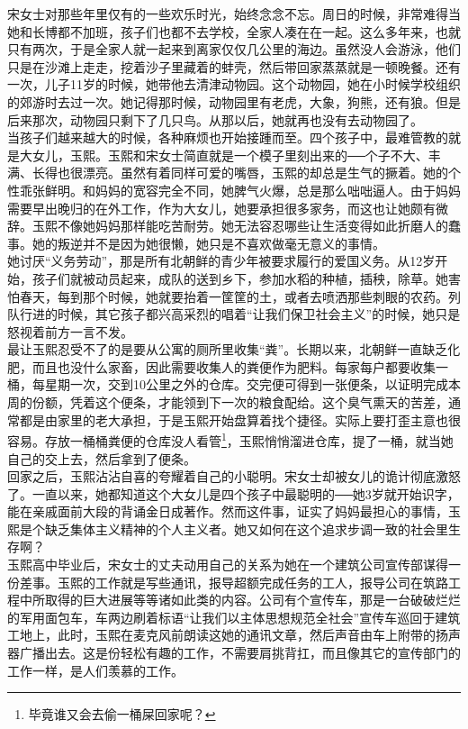 宋女士对那些年里仅有的一些欢乐时光，始终念念不忘。周日的时候，非常难得当她和长博都不加班，孩子们也都不去学校，全家人凑在在一起。这么多年来，也就只有两次，于是全家人就一起来到离家仅仅几公里的海边。虽然没人会游泳，他们只是在沙滩上走走，挖着沙子里藏着的蚌壳，然后带回家蒸蒸就是一顿晚餐。还有一次，儿子11岁的时候，她带他去清津动物园。这个动物园，她在小时候学校组织的郊游时去过一次。她记得那时候，动物园里有老虎，大象，狗熊，还有狼。但是后来那次，动物园只剩下了几只鸟。从那以后，她就再也没有去动物园了。\\

当孩子们越来越大的时候，各种麻烦也开始接踵而至。四个孩子中，最难管教的就是大女儿，玉熙。玉熙和宋女士简直就是一个模子里刻出来的──个子不大、丰满、长得也很漂亮。虽然有着同样可爱的嘴唇，玉熙的却总是生气的撅着。她的个性乖张鲜明。和妈妈的宽容完全不同，她脾气火爆，总是那么咄咄逼人。由于妈妈需要早出晚归的在外工作，作为大女儿，她要承担很多家务，而这也让她颇有微辞。玉熙不像她妈妈那样能吃苦耐劳。她无法容忍哪些让生活变得如此折磨人的蠢事。她的叛逆并不是因为她很懒，她只是不喜欢做毫无意义的事情。\\

她讨厌“义务劳动”，那是所有北朝鲜的青少年被要求履行的爱国义务。从12岁开始，孩子们就被动员起来，成队的送到乡下，参加水稻的种植，插秧，除草。她害怕春天，每到那个时候，她就要抬着一筐筐的土，或者去喷洒那些刺眼的农药。列队行进的时候，其它孩子都兴高采烈的唱着“让我们保卫社会主义”的时候，她只是怒视着前方一言不发。\\

最让玉熙忍受不了的是要从公寓的厕所里收集“粪”。长期以来，北朝鲜一直缺乏化肥，而且也没什么家畜，因此需要收集人的粪便作为肥料。每家每户都要收集一桶，每星期一次，交到10公里之外的仓库。交完便可得到一张便条，以证明完成本周的份额，凭着这个便条，才能领到下一次的粮食配给。这个臭气熏天的苦差，通常都是由家里的老大承担，于是玉熙开始盘算着找个捷径。实际上要打歪主意也很容易。存放一桶桶粪便的仓库没人看管\footnote{毕竟谁又会去偷一桶屎回家呢？}，玉熙悄悄溜进仓库，提了一桶，就当她自己的交上去，然后拿到了便条。\\

回家之后，玉熙沾沾自喜的夸耀着自己的小聪明。宋女士却被女儿的诡计彻底激怒了。一直以来，她都知道这个大女儿是四个孩子中最聪明的──她3岁就开始识字，能在亲戚面前大段的背诵金日成著作。然而这件事，证实了妈妈最担心的事情，玉熙是个缺乏集体主义精神的个人主义者。她又如何在这个追求步调一致的社会里生存啊？\\

玉熙高中毕业后，宋女士的丈夫动用自己的关系为她在一个建筑公司宣传部谋得一份差事。玉熙的工作就是写些通讯，报导超额完成任务的工人，报导公司在筑路工程中所取得的巨大进展等等诸如此类的内容。公司有个宣传车，那是一台破破烂烂的军用面包车，车两边刷着标语“让我们以主体思想规范全社会”宣传车巡回于建筑工地上，此时，玉熙在麦克风前朗读这她的通讯文章，然后声音由车上附带的扬声器广播出去。这是份轻松有趣的工作，不需要肩挑背扛，而且像其它的宣传部门的工作一样，是人们羡慕的工作。\\

